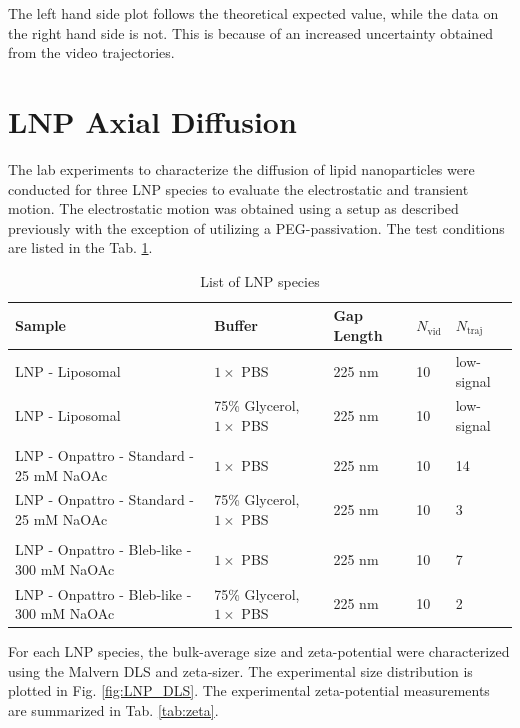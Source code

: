 The left hand side plot follows the theoretical expected value, while the data on the right hand side is not. This is because of an increased uncertainty obtained from the video trajectories.


\clearpage
\section{LNP Axial Diffusion}

The lab experiments to characterize the diffusion of lipid nanoparticles were conducted for three LNP species to evaluate the electrostatic and transient motion. The electrostatic motion was obtained using a setup as described previously with the exception of utilizing a PEG-passivation. The test conditions are listed in the Tab. \ref{tab:3_sample_list}.


\begin{table}[h!]
    \centering
    \begin{tabularx}{\textwidth}{@{}Xllll@{}}
        \toprule
        Sample & Buffer & Gap Length&  $N_\mathrm{vid}$ & $N_\mathrm{traj}$ \\
        \midrule
        LNP - Liposomal & $1\times$ PBS & 225 nm& 10& low-signal\\
        LNP - Liposomal & 75\% Glycerol, $1\times$ PBS & 225 nm& 10 &low-signal \\
         \vspace{2pt} & & \\
        LNP - Onpattro - Standard - 25 mM NaOAc & $1\times$ PBS & 225 nm& 10& 14\\
        LNP - Onpattro - Standard - 25 mM NaOAc & 75\% Glycerol, $1\times$ PBS & 225 nm& 10&3 \\
         \vspace{2pt}&& & \\
        LNP - Onpattro - Bleb-like - 300 mM NaOAc & $1\times$ PBS & 225 nm& 10& 7\\
        LNP - Onpattro - Bleb-like - 300 mM NaOAc & 75\% Glycerol, $1\times$ PBS & 225 nm&10 & 2 \\
        \bottomrule
    \end{tabularx}
    \caption{List of LNP species}
    \label{tab:3_sample_list}
\end{table}

For each LNP species, the bulk-average size and zeta-potential were characterized using the Malvern DLS and zeta-sizer. The experimental size distribution is plotted in Fig. \ref{fig:LNP_DLS}. The experimental zeta-potential measurements are summarized in Tab. \ref{tab:zeta}.

